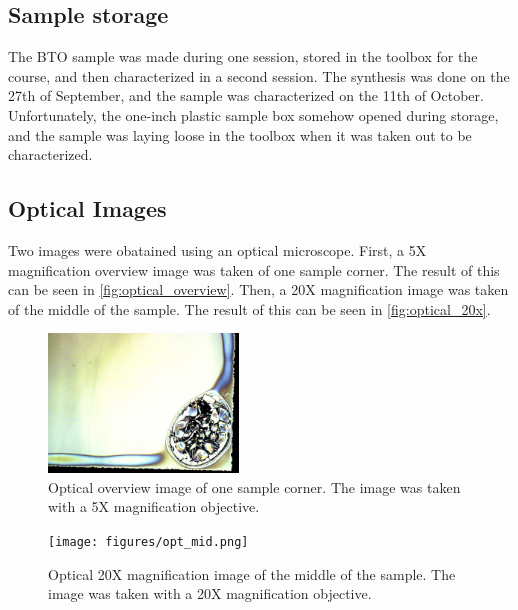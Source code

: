 \subsection{Sample storage}
\label{sec:sample-storage}
\noindent The BTO sample was made during one session, stored in the toolbox for the course, and then characterized in a second session. 
The synthesis was done on the 27th of September, and the sample was characterized on the 11th of October.
Unfortunately, the one-inch plastic sample box somehow opened during storage, and the sample was laying loose in the toolbox when it was taken out to be characterized.




\subsection{Optical Images}

\noindent Two images were obatained using an optical microscope.
First, a 5X magnification overview image was taken of one sample corner.
The result of this can be seen in \autoref{fig:optical_overview}.
Then, a 20X magnification image was taken of the middle of the sample.
The result of this can be seen in \autoref{fig:optical_20x}.

\begin{figure}
    \centering
    \includegraphics[width=0.45\textwidth]{figures/opt_corner.png}
    \caption{
        Optical overview image of one sample corner.
        The image was taken with a 5X magnification objective.
    }
    \label{fig:optical_overview}
\end{figure}

\begin{figure}
    \centering
    \texttt{[image: figures/opt\_mid.png]}
    \caption{
        Optical 20X magnification image of the middle of the sample.
        The image was taken with a 20X magnification objective.
    }
    \label{fig:optical_20x}
\end{figure}


